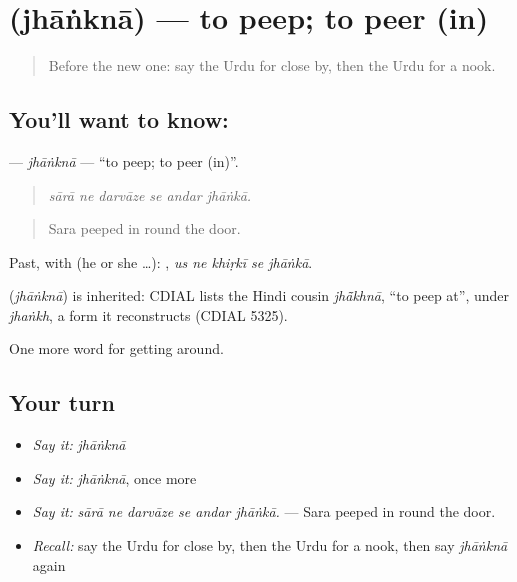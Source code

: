 \section[\texorpdfstring{\ur{جھانکنا} (jhāṅknā)}{جھانکنا (jhāṅknā)}]{ (jhāṅknā) — to peep; to peer (in)}

\label{lesson:UR-C409-jhankna}



\begin{quote}
Before the new one: say the Urdu for close by, then the Urdu for a nook.
\end{quote}

\subsection*{You'll want to know: }
\textbf{} — \emph{jhāṅknā} — \textquotedblleft{}to peep; to peer (in)\textquotedblright{}.

\begin{quote}
     
\end{quote}

\begin{quote}
\emph{sārā ne darvāze se andar jhāṅkā.}
\end{quote}

\begin{quote}
Sara peeped in round the door.
\end{quote}

Past, with  (he or she …):     , \emph{us ne khiṛkī se jhāṅkā}.

\begin{cousinweb}
\textbf{} (\emph{jhāṅknā}) is inherited: CDIAL lists the Hindi cousin \emph{jhā̃khnā}, \textquotedblleft{}to peep at\textquotedblright{}, under \emph{jhaṅkh}, a form it reconstructs (CDIAL 5325).
\end{cousinweb}

\begin{grammarlens}[title={What you've built}]
One more word for getting around.
\end{grammarlens}

\subsection*{Your turn}
\begin{itemize}
\raggedright
  \item \emph{Say it:} \emph{jhāṅknā}
  \item \emph{Say it:} \emph{jhāṅknā}, once more
  \item \emph{Say it:} \emph{sārā ne darvāze se andar jhāṅkā.} — Sara peeped in round the door.
  \item \emph{Recall:} say the Urdu for close by, then the Urdu for a nook, then say \emph{jhāṅknā} again
\end{itemize}

